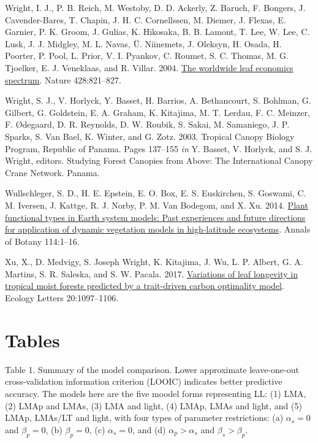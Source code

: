 \documentclass[
  12pt,
  a4paper,
,tablecaptionabove
]{scrartcl}
\newlength{\cslhangindent}
\newenvironment{CSLReferences}[2] %
 {%
  \setlength{\parindent}{0pt}
  \ifodd #1 \everypar{\setlength{\hangindent}{\cslhangindent}}\ignorespaces\fi
  \ifnum #2 > 0
  \setlength{\parskip}{#2\baselineskip}
  \fi
 }%
 {}
\begin{document}
\begin{CSLReferences}{1}{0}
\leavevmode{}%
Wright, I. J., P. B. Reich, M. Westoby, D. D. Ackerly, Z. Baruch, F.
Bongers, J. Cavender-Bares, T. Chapin, J. H. C. Cornellssen, M. Diemer,
J. Flexas, E. Garnier, P. K. Groom, J. Gulias, K. Hikosaka, B. B.
Lamont, T. Lee, W. Lee, C. Lusk, J. J. Midgley, M. L. Navas, Ü.
Niinemets, J. Oleksyn, H. Osada, H. Poorter, P. Pool, L. Prior, V. I.
Pyankov, C. Roumet, S. C. Thomas, M. G. Tjoelker, E. J. Veneklaas, and
R. Villar. 2004. \href{https://doi.org/10.1038/nature02403}{The
worldwide leaf economics spectrum}. Nature 428:821--827.

\leavevmode{}%
Wright, S. J., V. Horlyck, Y. Basset, H. Barrios, A. Bethancourt, S.
Bohlman, G. Gilbert, G. Goldstein, E. A. Graham, K. Kitajima, M. T.
Lerdau, F. C. Meinzer, F. Ødegaard, D. R. Reynolds, D. W. Roubik, S.
Sakai, M. Samaniego, J. P. Sparks, S. Van Bael, K. Winter, and G. Zotz.
2003. Tropical {Canopy Biology Program}, {Republic} of {Panama}. Pages
137--155 \emph{in} Y. Basset, V. Horlyck, and S. J. Wright, editors.
Studying {Forest Canopies} from {Above}: {The International Canopy Crane
Network}. {Panama}.

\leavevmode{}%
Wullschleger, S. D., H. E. Epstein, E. O. Box, E. S. Euskirchen, S.
Goswami, C. M. Iversen, J. Kattge, R. J. Norby, P. M. Van Bodegom, and
X. Xu. 2014. \href{https://doi.org/10.1093/aob/mcu077}{Plant functional
types in {Earth} system models: {Past} experiences and future directions
for application of dynamic vegetation models in high-latitude
ecosystems}. Annals of Botany 114:1--16.

\leavevmode{}%
Xu, X., D. Medvigy, S. Joseph Wright, K. Kitajima, J. Wu, L. P. Albert,
G. A. Martins, S. R. Saleska, and S. W. Pacala. 2017.
\href{https://doi.org/10.1111/ele.12804}{Variations of leaf longevity in
tropical moist forests predicted by a trait-driven carbon optimality
model}. Ecology Letters 20:1097--1106.

\end{CSLReferences}

\newpage

\hypertarget{tables}{%
\section{Tables}\label{tables}}

Table 1. Summary of the model comparison. Lower approximate
leave-one-out cross-validation information criterion (LOOIC) indicates
better predictive accuracy. The models here are the five moodel forms
representing LL: (1) LMA, (2) LMAp and LMAs, (3) LMA and light, (4)
LMAp, LMAs and light, and (5) LMAp, LMAs/LT and light, with four types
of parameter restrictions: (a) \(\alpha_s = 0\) and \(\beta_p = 0\), (b)
\(\beta_p = 0\), (c) \(\alpha_s = 0\), and (d) \(\alpha_p > \alpha_s\)
and \(\beta_s > \beta_p\).
\end{document}
